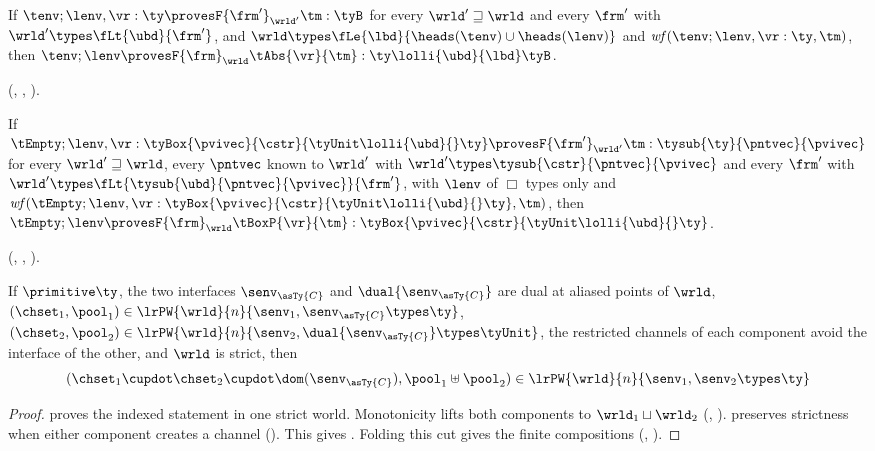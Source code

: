 \begin{lemma}
  \label{lem:comp:abs}
  If $\tenv ; \lenv , \vr : \ty \provesF{\frm'}_{\wrld'} \tm : \tyB$ for
  every $\wrld' \mathrel{\sqsupseteq} \wrld$ and every $\frm'$ with
  $\wrld' \types \fLt{\ubd}{\frm'}$,
  and $\wrld \types \fLe{\lbd}{\heads(\tenv) \cup \heads(\lenv)}$ and
  $\mathit{wf}(\tenv ; \lenv , \vr : \ty, \tm)$, then
  $\tenv ; \lenv \provesF{\frm}_{\wrld} \tAbs{\vr}{\tm}
    : \ty \lolli{\ubd}{\lbd} \tyB$.
\end{lemma}

(, , ).

\begin{lemma}
  \label{lem:comp:exp}
  If
  $\tEmpty ; \lenv , \vr : \tyBox{\pvivec}{\cstr}{\tyUnit \lolli{\ubd}{} \ty}
     \provesF{\frm'}_{\wrld'} \tm : \tysub{\ty}{\pntvec}{\pvivec}$
  for every $\wrld' \mathrel{\sqsupseteq} \wrld$, every $\pntvec$ known to
  $\wrld'$ with $\wrld' \types \tysub{\cstr}{\pntvec}{\pvivec}$ and every
  $\frm'$ with $\wrld' \types \fLt{\tysub{\ubd}{\pntvec}{\pvivec}}{\frm'}$,
  with $\lenv$ of $\Box$ types only and
  $\mathit{wf}(\tEmpty ; \lenv , \vr : \tyBox{\pvivec}{\cstr}{\tyUnit \lolli{\ubd}{} \ty}, \tm)$,
  then
  $\tEmpty ; \lenv \provesF{\frm}_{\wrld} \tBoxP{\vr}{\tm}
    : \tyBox{\pvivec}{\cstr}{\tyUnit \lolli{\ubd}{} \ty}$.
\end{lemma}

(, , ).

\begin{lemma}
  \label{lem:comp:connect}
  If $\primitive \ty$, the two interfaces
  $\senv_{\asTy{C}}$ and $\dual{\senv_{\asTy{C}}}$ are dual at aliased
  points of $\wrld$,
  $(\chset_1, \pool_1) \in \lrPW{\wrld}{n}{\senv_1 , \senv_{\asTy{C}} \types \ty}$,
  $(\chset_2, \pool_2) \in \lrPW{\wrld}{n}{\senv_2 , \dual{\senv_{\asTy{C}}} \types \tyUnit}$,
  the restricted channels of each component avoid the interface of the
  other, and $\wrld$ is strict, then
  \[
    (\chset_1 \cupdot \chset_2 \cupdot \dom(\senv_{\asTy{C}}),
     \pool_1 \uplus \pool_2)
      \in \lrPW{\wrld}{n}{\senv_1 , \senv_2 \types \ty}
  \]
\end{lemma}

\begin{proof}
   proves the indexed statement in one strict world.
  Monotonicity lifts both components to $\wrld_1\sqcup\wrld_2$
  (, ).
   preserves strictness when either component
  creates a channel (). This gives
  . Folding this cut gives the finite compositions
  (, ).
\end{proof}

